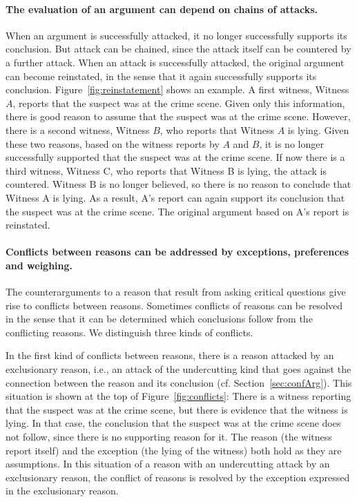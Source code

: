\documentclass[10pt]{article}
\begin{document}
\paragraph{The evaluation of an argument can depend on chains of attacks.} When an argument is successfully attacked, it no longer successfully supports its conclusion. But attack can be chained, since the attack itself can be countered by a further attack. When an attack is successfully attacked, the original argument can become reinstated, in the sense that it again successfully supports its conclusion. Figure~\ref{fig:reinstatement} shows an example. A first witness, Witness $A$, reports that the suspect was at the crime scene. Given only this information, there is good reason to assume that the suspect was at the crime scene. However, there is a second witness, Witness $B$, who reports that Witness $A$ is lying. Given these two reasons, based on the witness reports by $A$ and $B$, it is no longer successfully supported that the suspect was at the crime scene. If now there is a third witness, Witness C, who reports that Witness B is lying, the attack is countered. Witness B is no longer believed, so there is no reason to conclude that Witness A is lying. As a result, A's report can again support its conclusion that the suspect was at the crime scene. The original argument based on A's report is reinstated. 

\paragraph{Conflicts between reasons can be addressed by exceptions, preferences and weighing.} The counterarguments to a reason that result from asking critical questions give rise to conflicts between reasons. Sometimes conflicts of reasons can be resolved in the sense that it can be determined which conclusions follow from the conflicting reasons. We distinguish three kinds of conflicts. 

In the first kind of conflicts between reasons, there is a reason attacked by an exclusionary reason, i.e., an attack of the undercutting kind that goes against the connection between the reason and its conclusion (cf. Section~\ref{sec:confArg}). This situation is shown at the top of Figure~\ref{fig:conflicts}: There is a witness reporting that the suspect was at the crime scene, but there is evidence that the witness is lying. 
In that case, the conclusion that the suspect was at the crime scene does not follow, since there is no supporting reason for it. The reason (the witness report itself) and the exception (the lying of the witness) both hold as they are assumptions. %
In this situation of a reason with an undercutting attack by an exclusionary reason, the conflict of reasons is resolved by the exception expressed in the exclusionary reason. 
\end{document}
